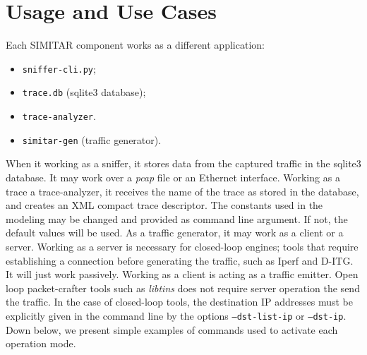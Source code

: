 \section{Usage and Use Cases}

Each SIMITAR component works as a different application:

\begin{itemize}
	\item \texttt{sniffer-cli.py};
	\item \texttt{trace.db} (sqlite3 database);
	\item \texttt{trace-analyzer}.
	\item \texttt{simitar-gen} (traffic generator).
\end{itemize}


When it working as a sniffer, it stores data from the captured traffic in the sqlite3 database. It may work over a \textit{pcap} file or an Ethernet interface. Working as a trace a trace-analyzer, it receives the name of the trace as stored in the database, and creates an XML compact trace descriptor. The constants used in the modeling may be changed and provided as command line argument. If not, the default values will be used. As a traffic generator, it may work as a client or a server. Working as a server is necessary for closed-loop engines; tools that require establishing a connection before generating the traffic, such as Iperf and D-ITG. It will just work passively. Working as a client is acting as a traffic emitter. Open loop packet-crafter tools such as \textit{libtins} does not require server operation the send the traffic. In the case of closed-loop tools, the destination IP addresses must be explicitly given in the command line by the options \texttt{--dst-list-ip} or \texttt{--dst-ip}. Down below, we present simple examples of commands used to activate each operation mode.


